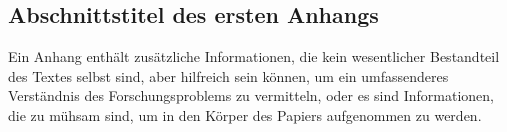 \documentclass[pdflatex,sn-mathphys-num]{sn-jnl}%
\theoremstyle{thmstyleone}%
\theoremstyle{thmstyletwo}%
\theoremstyle{thmstylethree}%
\begin{document}
\begin{appendices}

\section{Abschnittstitel des ersten Anhangs} \label{secA1}

Ein Anhang enthält zusätzliche Informationen, die kein wesentlicher Bestandteil des Textes selbst sind, aber hilfreich sein können, um ein umfassenderes Verständnis des Forschungsproblems zu vermitteln, oder es sind Informationen, die zu mühsam sind, um in den Körper des Papiers aufgenommen zu werden.




\end{appendices}


\end{document}
